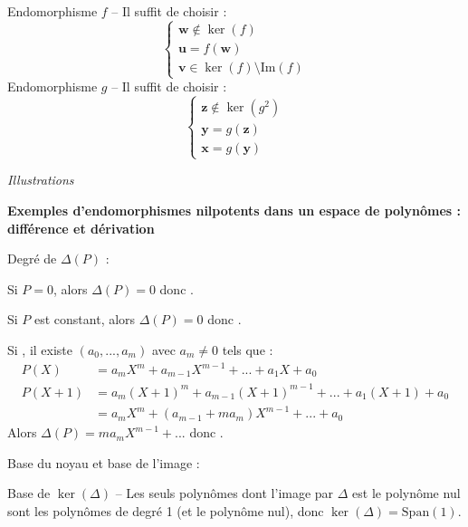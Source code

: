 \documentclass[10pt,a4paper]{article}
\begin{document}
Endomorphisme \(f\) -- Il suffit de choisir :
\[
\begin{cases}
\mathbf{w} \notin \ker(f)\\
\mathbf{u} = f(\mathbf{w})\\
\mathbf{v} \in \ker(f) \setminus \mathrm{Im}(f)
\end{cases}
\]
Endomorphisme \(g\) -- Il suffit de choisir :
\[
\begin{cases}
\mathbf{z} \notin \ker(g^2)\\
\mathbf{y} = g(\mathbf{z})\\
\mathbf{x} = g(\mathbf{y})
\end{cases}
\]

\q \emph{Illustrations}


\bigskip
\textbf{Exemples d'endomorphismes nilpotents dans un espace de polynômes : différence et dérivation}

\q Degré de \(\Delta(P)\) :

Si \( P = 0\), alors \(\Delta(P) = 0\) donc .

Si \( P\) est constant, alors \(\Delta(P) = 0\) donc  .

Si , il existe \((a_0, ..., a_m)\) avec \(a_m \neq 0\) tels que :
\[
\begin{aligned}
 P(X) & = a_m X^m + a_{m-1} X^{m-1} + ... + a_1 X + a_0\\
 P(X+1) & = a_m (X+1)^m + a_{m-1} (X+1)^{m-1} + ... + a_1 (X+1) + a_0\\
 & = a_m X^m + (a_{m-1} + m a_m)X^{m-1} + ... + a_0
\end{aligned}
\]
Alors \(\Delta(P) = m a_m X^{m-1} + ...\) donc .

\q Base du noyau et base de l'image :

Base de \(\ker(\Delta)\) -- Les seuls polynômes dont l'image par \(\Delta\) est le polynôme nul sont les polynômes de degré 1
(et le polynôme nul), donc \(\ker(\Delta) = \mathrm{Span}(1)\).

\end{document}
